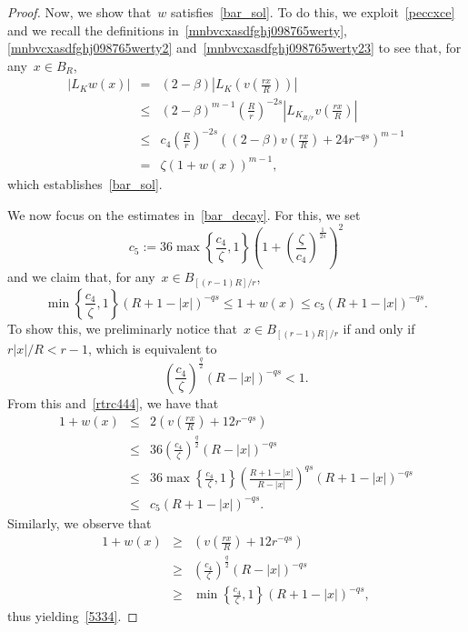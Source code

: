 \documentclass[10pt,a4paper]{amsart}
\numberwithin{equation}{section}
\begin{document}
\begin{proof}
Now, we show that~$w$ satisfies~\eqref{bar_sol}. To do this, we exploit~\eqref{peccxce}
and we recall the definitions in~\eqref{mnbvcxasdfghj098765werty},
\eqref{mnbvcxasdfghj098765werty2} and~\eqref{mnbvcxasdfghj098765werty23} to see that, for any~$x \in B_R$,
\begin{eqnarray*}
|{L}_{K} w (x) | & = & (2-\beta) \left| {L}_K \left(v \left(\frac{rx}{R}\right) \right)\right|\\
& \leq & (2-\beta)^{m-1} \left(\frac{R}{r}\right)^{-2s} \left| {L}_{K_{R/r}} v \left(\frac{rx}{R}\right) \right| \\
&\leq & c_4  \left(\frac{R}{r}\right)^{-2s} \left((2-\beta) v \left(\frac{rx}{R}\right)+24 r^{-qs}\right)^{m-1}\\
&=& \zeta \left(1+w(x)\right)^{m-1},
\end{eqnarray*}
which establishes~\eqref{bar_sol}.

We now focus on the estimates in~\eqref{bar_decay}.
For this, we set
$$
c_5:=36 \max\left\{ \frac{c_4}{\zeta}, 1 \right\} \left(1+\left(\frac{\zeta}{c_4}\right)^{\frac{1}{2s}}\right)^2
$$
and we claim that, for any~$ x \in B_{[(r-1)R]/r}$,
\begin{equation}\label{5334}
 \min\left\{ \frac{c_4}{\zeta}, 1 \right\} (R+1-|x |)^{-qs} \leq 1+w(x) \leq c_5 (R+1-|x |)^{-qs}.
\end{equation}
To show this, we preliminarly notice that~$
x \in B_{[(r-1)R]/r}$ if and only if~$r|x|/{R} <r-1$, which is equivalent to
$$ \left(\frac{c_4}{\zeta}\right)^{\frac{q}{2}}(R-|x |)^{-qs}<1.
$$
{F}rom this and~\eqref{rtrc444}, we have that
\begin{eqnarray*}
1+w(x) &\leq & 2 \left( v\left( \frac{rx}{R}\right) + 12 r^{-qs} \right) \\ 
&\leq & 36 \left(\frac{c_4}{\zeta}\right)^{\frac{q}{2}} \left(R - |x | \right)^{-qs}\\
&\leq &36 \max\left\{ \frac{c_4}{\zeta}, 1 \right\} \left( \frac{R+1-|x |}{R-|x |}\right)^{qs} (R+1-|x |)^{-qs}\\
&\leq & c_5 (R+1-|x |)^{-qs}.
\end{eqnarray*}
Similarly, we observe that
\begin{eqnarray*}
1+w(x) &\geq & \left( v\left( \frac{rx}{R}\right) + 12 r^{-qs} \right) \\ 
&\geq & \left(\frac{c_4}{\zeta}\right)^{\frac{q}{2}}  \left(R -|x | \right)^{-qs} \\
&\geq &  \min\left\{ \frac{c_4}{\zeta}, 1 \right\}  \left(R +1- |x | \right)^{-qs},
\end{eqnarray*}
thus yielding~\eqref{5334}.


\end{proof}
\end{document}
